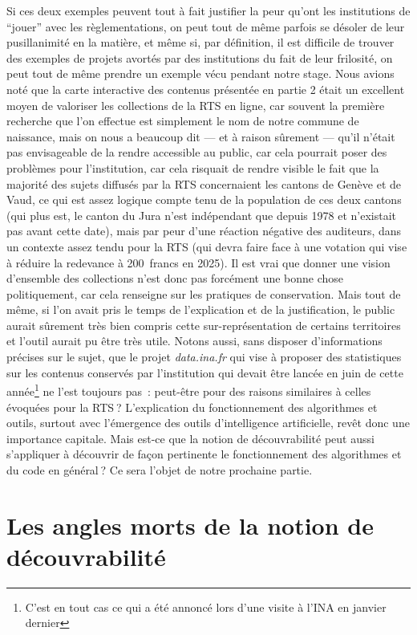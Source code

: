 Si ces deux exemples peuvent tout à fait justifier la peur qu’ont les institutions de \enquote{jouer} avec les règlementations, on peut tout de même parfois se désoler de leur pusillanimité en la matière, et même si, par définition, il est difficile de trouver des exemples de projets avortés par des institutions du fait de leur frilosité, on peut tout de même prendre un exemple vécu pendant notre stage. Nous avions noté que la carte interactive des contenus présentée en partie 2 était un excellent moyen de valoriser les collections de la RTS en ligne, car souvent la première recherche que l’on effectue est simplement le nom de notre commune de naissance, mais on nous a beaucoup dit — et à raison sûrement — qu’il n’était pas envisageable de la rendre accessible au public, car cela pourrait poser des problèmes pour l’institution, car cela risquait de rendre visible le fait que la majorité des sujets diffusés par la RTS concernaient les cantons de Genève et de Vaud, ce qui est assez logique compte tenu de la population de ces deux cantons (qui plus est, le canton du Jura n’est indépendant que depuis 1978 et n’existait pas avant cette date), mais par peur d’une réaction négative des auditeurs, dans un contexte assez tendu pour la RTS (qui devra faire face à une votation qui vise à réduire la redevance à 200 francs en 2025). Il est vrai que donner une vision d’ensemble des collections n’est donc pas forcément une bonne chose politiquement, car cela renseigne sur les pratiques de conservation. Mais tout de même, si l’on avait pris le temps de l’explication et de la justification, le public aurait sûrement très bien compris cette sur-représentation de certains territoires et l’outil aurait pu être très utile. Notons aussi, sans disposer d’informations précises sur le sujet, que le projet \textit{data.ina.fr} qui vise à proposer des statistiques sur les contenus conservés par l’institution qui devait être lancée en juin de cette année\footnote{C'est en tout cas ce qui a été annoncé lors d'une visite à l'INA en janvier dernier} ne l’est toujours pas : peut-être pour des raisons similaires à celles évoquées pour la RTS ? L’explication du fonctionnement des algorithmes et outils, surtout avec l’émergence des outils d’intelligence artificielle, revêt donc une importance capitale. Mais est-ce que la notion de découvrabilité peut aussi s’appliquer à découvrir de façon pertinente le fonctionnement des algorithmes et du code en général ? Ce sera l’objet de notre prochaine partie.


\chapter{Les angles morts de la notion de découvrabilité}


